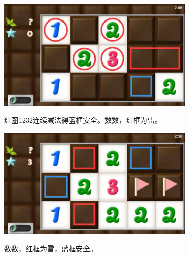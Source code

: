 \subsection{} %
\begin{center}
    \includegraphics[width=0.7\textwidth]{puzzlelow/36-1.jpg}
\end{center}
红圈1232连续减法得蓝框安全。数数，红框为雷。
\begin{center}
    \includegraphics[width=0.7\textwidth]{puzzlelow/36-2.jpg}
\end{center}
数数，红框为雷，蓝框安全。

